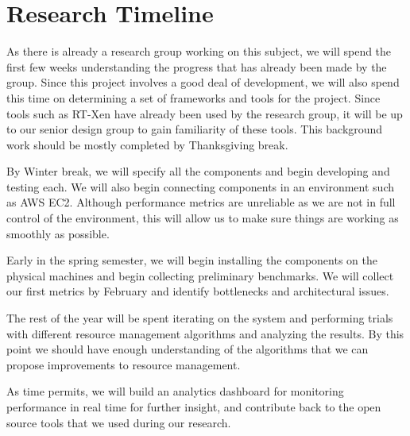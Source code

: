 \documentclass{sig-alternate}
\begin{document}
\section{Research Timeline}
\label{sec:research_timeline}

As there is already a research group working on this subject, we will spend the first few weeks understanding the progress that has already been made by the group. Since this project involves a good deal of development, we will also spend this time on determining a set of frameworks and tools for the project. Since tools such as RT-Xen have already been used by the research group, it will be up to our senior design group to gain familiarity of these tools. This background work should be mostly completed by Thanksgiving break.

By Winter break, we will specify all the components and begin developing and testing each. We will also begin connecting components in an environment such as AWS EC2. Although performance metrics are unreliable as we are not in full control of the environment, this will allow us to make sure things are working as smoothly as possible.

Early in the spring semester, we will begin installing the components on the physical machines and begin collecting preliminary benchmarks. We will collect our first metrics by February and identify bottlenecks and architectural issues.

The rest of the year will be spent iterating on the system and performing trials with different resource management algorithms and analyzing the results. By this point we should have enough understanding of the algorithms that we can propose improvements to resource management.

As time permits, we will build an analytics dashboard for monitoring performance in real time for further insight, and contribute back to the open source tools that we used during our research.


\end{document}
